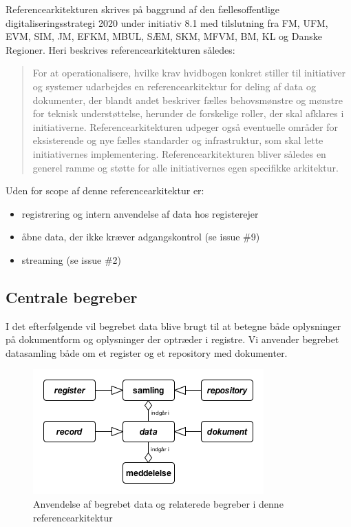 Referencearkitekturen skrives på baggrund af den fællesoffentlige
digitaliseringsstrategi 2020 under initiativ 8.1 med tilslutning fra FM,
UFM, EVM, SIM, JM, EFKM, MBUL, SÆM, SKM, MFVM, BM, KL og Danske
Regioner. Heri beskrives referencearkitekturen således:

\begin{quote}
For at operationalisere, hvilke krav hvidbogen konkret stiller til
initiativer og systemer udarbejdes en referencearkitektur for deling af
data og dokumenter, der blandt andet beskriver fælles behovsmønstre og
mønstre for teknisk understøttelse, herunder de forskelige roller, der
skal afklares i initiativerne. Referencearkitekturen udpeger også
eventuelle områder for eksisterende og nye fælles standarder og
infrastruktur, som skal lette initiativernes implementering.
Referencearkitekturen bliver således en generel ramme og støtte for alle
initiativernes egen specifikke arkitektur.
\end{quote}

Uden for scope af denne referencearkitektur er:

\begin{itemize}
\tightlist
\item
  registrering og intern anvendelse af data hos registerejer
\item
  åbne data, der ikke kræver adgangskontrol (se issue \#9)
\item
  streaming (se issue \#2)
\end{itemize}

\subsection{Centrale begreber}\label{centrale-begreber}

I det efterfølgende vil begrebet data blive brugt til at betegne både
oplysninger på dokumentform og oplysninger der optræder i registre. Vi
anvender begrebet datasamling både om et register og et repository med
dokumenter.

\begin{figure}
\centering
\includegraphics{figures/abstraktion.png}
\caption{Anvendelse af begrebet data og relaterede begreber i denne
referencearkitektur}
\end{figure}

